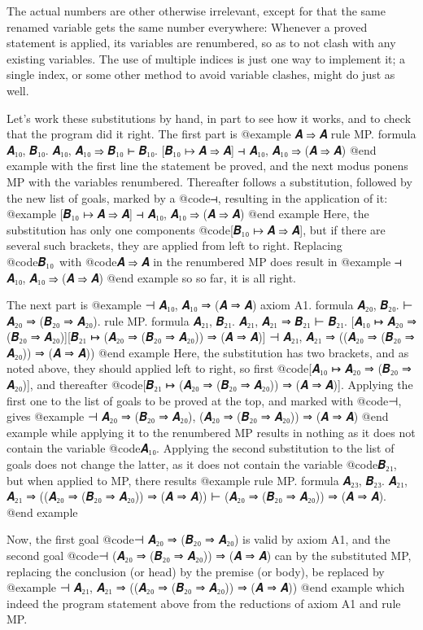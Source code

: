 The actual numbers are other otherwise irrelevant, except for that the same renamed variable gets the same number everywhere: Whenever a proved statement is applied, its variables are renumbered, so as to not clash with any existing variables. The use of multiple indices is just one way to implement it; a single index, or some other method to avoid variable clashes, might do just as well.

Let's work these substitutions by hand, in part to see how it works, and to check that the program did it right. The first part is
@example
  𝑨 ⇒ 𝑨
rule MP. formula 𝑨₁₀, 𝑩₁₀.
  𝑨₁₀, 𝑨₁₀ ⇒ 𝑩₁₀ ⊢ 𝑩₁₀.
[𝑩₁₀ ↦ 𝑨 ⇒ 𝑨]
 ⊣ 𝑨₁₀, 𝑨₁₀ ⇒ (𝑨 ⇒ 𝑨)
@end example
with the first line the statement be proved, and the next modus ponens MP with the variables renumbered. Thereafter follows a substitution, followed by the new list of goals, marked by a @code{⊣}, resulting in the application of it:
@example
[𝑩₁₀ ↦ 𝑨 ⇒ 𝑨]
 ⊣ 𝑨₁₀, 𝑨₁₀ ⇒ (𝑨 ⇒ 𝑨)
@end example
Here, the substitution has only one components @code{[𝑩₁₀ ↦ 𝑨 ⇒ 𝑨]}, but if there are several such brackets, they are applied from left to right. Replacing @code{𝑩₁₀} with @code{𝑨 ⇒ 𝑨} in the renumbered MP does result in
@example
 ⊣ 𝑨₁₀, 𝑨₁₀ ⇒ (𝑨 ⇒ 𝑨)
@end example
so so far, it is all right.

The next part is
@example
 ⊣ 𝑨₁₀, 𝑨₁₀ ⇒ (𝑨 ⇒ 𝑨)
axiom A1. formula 𝑨₂₀, 𝑩₂₀.
  ⊢ 𝑨₂₀ ⇒ (𝑩₂₀ ⇒ 𝑨₂₀).
rule MP. formula 𝑨₂₁, 𝑩₂₁.
  𝑨₂₁, 𝑨₂₁ ⇒ 𝑩₂₁ ⊢ 𝑩₂₁.
[𝑨₁₀ ↦ 𝑨₂₀ ⇒ (𝑩₂₀ ⇒ 𝑨₂₀)][𝑩₂₁ ↦ (𝑨₂₀ ⇒ (𝑩₂₀ ⇒ 𝑨₂₀)) ⇒ (𝑨 ⇒ 𝑨)]
 ⊣ 𝑨₂₁, 𝑨₂₁ ⇒ ((𝑨₂₀ ⇒ (𝑩₂₀ ⇒ 𝑨₂₀)) ⇒ (𝑨 ⇒ 𝑨))
@end example
Here, the substitution has two brackets, and as noted above, they should applied left to right, so first @code{[𝑨₁₀ ↦ 𝑨₂₀ ⇒ (𝑩₂₀ ⇒ 𝑨₂₀)]}, and thereafter @code{[𝑩₂₁ ↦ (𝑨₂₀ ⇒ (𝑩₂₀ ⇒ 𝑨₂₀)) ⇒ (𝑨 ⇒ 𝑨)]}. Applying the first one to the list of goals to be proved at the top, and marked with @code{⊣}, gives
@example
 ⊣ 𝑨₂₀ ⇒ (𝑩₂₀ ⇒ 𝑨₂₀), (𝑨₂₀ ⇒ (𝑩₂₀ ⇒ 𝑨₂₀)) ⇒ (𝑨 ⇒ 𝑨)
@end example
while applying it to the renumbered MP results in nothing as it does not contain the variable @code{𝑨₁₀}. Applying the second substitution to the list of goals does not change the latter, as it does not contain the variable @code{𝑩₂₁}, but when applied to MP, there results
@example
rule MP. formula 𝑨₂₃, 𝑩₂₃.
  𝑨₂₁, 𝑨₂₁ ⇒ ((𝑨₂₀ ⇒ (𝑩₂₀ ⇒ 𝑨₂₀)) ⇒ (𝑨 ⇒ 𝑨)) ⊢ (𝑨₂₀ ⇒ (𝑩₂₀ ⇒ 𝑨₂₀)) ⇒ (𝑨 ⇒ 𝑨).
@end example

Now, the first goal @code{⊣ 𝑨₂₀ ⇒ (𝑩₂₀ ⇒ 𝑨₂₀)} is valid by axiom A1, and the second goal @code{⊣ (𝑨₂₀ ⇒ (𝑩₂₀ ⇒ 𝑨₂₀)) ⇒ (𝑨 ⇒ 𝑨)} can by the substituted MP, replacing the conclusion (or head) by the premise (or body), be replaced by
@example
 ⊣ 𝑨₂₁, 𝑨₂₁ ⇒ ((𝑨₂₀ ⇒ (𝑩₂₀ ⇒ 𝑨₂₀)) ⇒ (𝑨 ⇒ 𝑨))
@end example
which indeed the program statement above from the reductions of axiom A1 and rule MP.

